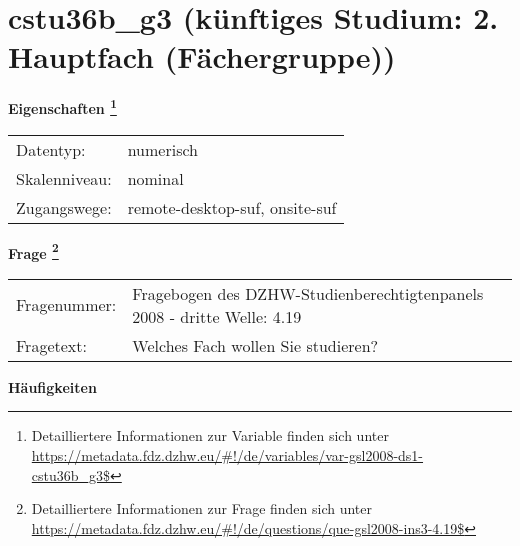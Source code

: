 
    \setcounter{footnote}{0}

    \vspace*{-1.8cm}
	\section{cstu36b\_g3 (künftiges Studium: 2. Hauptfach (Fächergruppe))}
	\label{section:cstu36b_g3}



    \vspace*{0.5cm}
    \noindent\textbf{Eigenschaften
	\footnote{Detailliertere Informationen zur Variable finden sich unter
		\url{https://metadata.fdz.dzhw.eu/\#!/de/variables/var-gsl2008-ds1-cstu36b_g3$}}}\\
	\begin{tabularx}{\hsize}{@{}lX}
	Datentyp: & numerisch \\
	Skalenniveau: & nominal \\
	Zugangswege: &
	  remote-desktop-suf, 
	  onsite-suf
 \\
    \end{tabularx}



				\vspace*{0.5cm}
                \noindent\textbf{Frage
	                \footnote{Detailliertere Informationen zur Frage finden sich unter
		              \url{https://metadata.fdz.dzhw.eu/\#!/de/questions/que-gsl2008-ins3-4.19$}}}\\
				\begin{tabularx}{\hsize}{@{}lX}
					Fragenummer: &
					  Fragebogen des DZHW-Studienberechtigtenpanels 2008 - dritte Welle:
					  4.19
 \\
					Fragetext: & Welches Fach wollen Sie studieren? \\
				\end{tabularx}





        		\vspace*{0.5cm}
                \noindent\textbf{Häufigkeiten}

